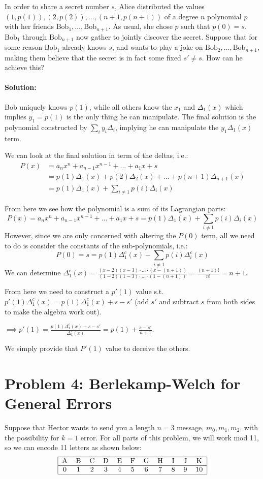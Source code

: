 \documentclass[11pt, notitlepage]{report}
\newcommand{\Question}[1]{\newpage\section{#1}}
\newenvironment{solution}{\paragraph{Solution:}}{\hfill}
\begin{document}
In order to share a secret number $s$, Alice distributed the values
$\left(1,p(1)\right), \left(2,p(2)\right), \dots, \left(n+1,p(n+1)\right)$ of a degree $n$ 
polynomial $p$ with her friends $\text{Bob}_1, \dots, \text{Bob}_{n+1}$. As usual, 
she chose $p$ such that $p(0) = s$. $\text{Bob}_1$ through $\text{Bob}_{n+1}$ now gather to 
jointly discover the secret. Suppose that for some reason $\text{Bob}_1$ already knows $s$,
and wants to play a joke on $\text{Bob}_2,\dots, \text{Bob}_{n+1}$, making them
believe that the secret is in fact some fixed $s' \neq s$. How can he achieve this?
\begin{solution}
	Bob uniquely knows $p(1)$, while all others know the $x_1$ and $\Delta_{1}(x)$ which implies $y_1=p(1)$ is the only thing he can manipulate. The final solution is the polynomial constructed by $\sum_{i}{y_i \Delta_i}$, implying he can manipulate the $y_1 \Delta_{1}(x)$ term. 
	
	We can look at the final solution in term of the deltas, i.e.:
	\begin{align*}P(x)&=a_{n}x^{n} + a_{n-1}x^{n-1} +...+a_1x+s\\
	&= p(1)\Delta_1(x) + p(2)\Delta_2(x) + ... +p(n+1)\Delta_{n+1}(x)\\
	&= p(1)\Delta_1(x) + \sum_{i\not=1}p(i)\Delta_i(x)
	\end{align*}
	
	From here we see how the polynomial is a sum of its Lagrangian parts:
	\[ P(x)=a_{n}x^{n} + a_{n-1}x^{n-1} +...+a_1x+s = p(1)\Delta_1(x) + \sum_{i\not=1}p(i)\Delta_i(x)\]
	However, since we are only concerned with altering the $P(0)$ term, all we need to do is consider the constants of the sub-polynomials, i.e.: 
		\[P(0) = s = p(1)\Delta_1^c(x) + \sum_{i\not=1}p(i)\Delta_i^c(x)\]
	We can determine $\Delta_1^c(x)=\frac{(x-2)(x-3)\cdot...\cdot(x-(n+1))}{(1-2)(1-3)\cdot...\cdot(1-(n+1))} = \frac{(n+1)!}{n!}=n+1$.
	
	From here we need to construct a $p'(1)$ value s.t. $p'(1)\Delta_1^c(x)=p(1)\Delta_1^c(x)+s-s'$ (add $s'$ and subtract $s$ from both sides to make the algebra work out).
	
	$\implies p'(1)=\frac{p(1)\Delta_1^c(x)+s-s'}{\Delta_1^c(x)}=p(1)+\frac{s-s'}{n+1}$.
	
	We simply provide that $P'(1)$ value to deceive the others.
\end{solution}

\Question{Problem 4: Berlekamp-Welch for General Errors}

Suppose that Hector wants to send you a length $n=3$ message, $m_0,m_1,m_2$, with the possibility for $k=1$ error. For all parts of this problem, we will work mod 11, so we can encode 11 letters as shown below:
$$\begin{tabular}{|ccccccccccc|}
\hline
A & B & C & D & E & F & G & H & I & J & K \\
\hline
0 & 1 & 2 & 3 & 4 & 5 & 6 & 7& 8 & 9 & 10 \\
\hline
\end{tabular}$$
\end{document}
